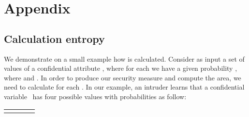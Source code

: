 \documentclass{llncs}
\begin{document}
\clearpage
\section*{Appendix}
\subsection*{Calculation entropy}
We demonstrate on a small example how   is calculated. Consider as input a set of values  of a confidential attribute , where for each  we have a given probability , where  and . In order to produce our security measure and compute the area, we need to calculate  for each . In our example, an intruder learns that a confidential variable ~has four possible values with probabilities as follow:

\begin{table}[h]
\begin{center}
\begin{tabular}{| l | l | l | l |}
\hline       &       &       &  \\
\hline    &     &     &   \\
\hline
\end{tabular}
 \label{table:NumericalExample}
\end{center}
\end{table}
\end{document}
